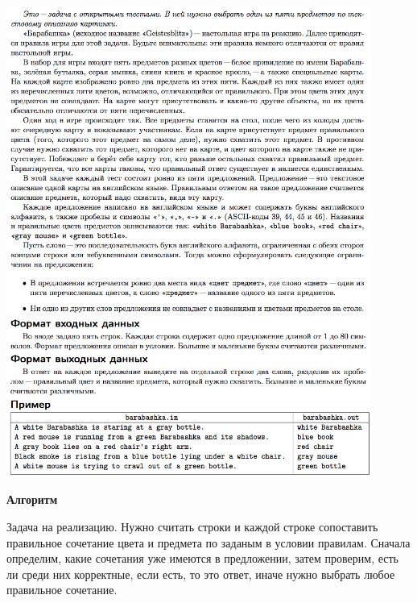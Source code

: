 \documentclass[a4paper,12pt]{article}
\begin{document}
\begin{center}
\includegraphics[width=0.9\textwidth]{OC_SPB/OC_SPB_A1.png}\\ [1cm]
\includegraphics[width=0.9\textwidth]{OC_SPB/OC_SPB_A2.png}\\ [1cm]
\end{center}
\newpage

\textbf{{\large Алгоритм}}

Задача на реализацию. Нужно считать строки и каждой строке сопоставить правильное сочетание цвета и предмета по заданым в условии правилам. Сначала определим, какие сочетания уже имеются в предложении, затем проверим, есть ли среди них корректные, если есть, то это ответ, иначе нужно выбрать любое правильное сочетание. \\
\end{document}
